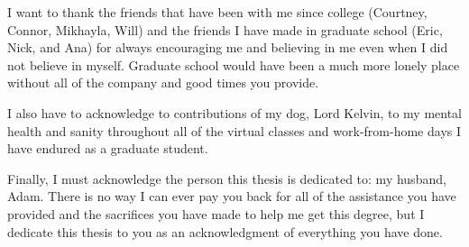 I want to thank the friends that have been with me since college (Courtney, Connor, Mikhayla, Will) and the friends I have made in graduate school (Eric, Nick, and Ana) for always encouraging me and believing in me even when I did not believe in myself. Graduate school would have been a much more lonely place without all of the company and good times you provide. 

I also have to acknowledge to contributions of my dog, Lord Kelvin, to my mental health and sanity throughout all of the virtual classes and work-from-home days I have endured as a graduate student.

Finally, I must acknowledge the person this thesis is dedicated to: my husband, Adam. There is no way I can ever pay you back for all of the assistance you have provided and the sacrifices you have made to help me get this degree, but I dedicate this thesis to you as an acknowledgment of everything you have done.
